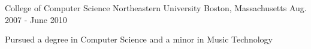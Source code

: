

\begin{cventries}

  \cventry
    {College of Computer Science} %
    {Northeastern University} %
    {Boston, Massachusetts} %
    {Aug. 2007 - June 2010} %
    {
      \begin{cvitems} %
        \item {Pursued a degree in Computer Science and a minor in Music Technology}
      \end{cvitems}
    }

\end{cventries}
